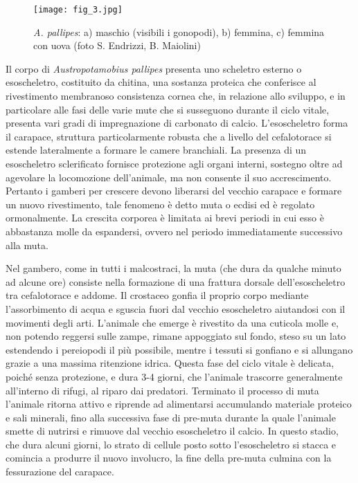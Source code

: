\documentclass[11pt,a4paper,italian,twoside,openany]{memoir}
\begin{document}
\begin{figure}[H]
  \centering
  \texttt{[image: fig\_3.jpg]}
  \caption{\emph{A. pallipes}: a) maschio (visibili i gonopodi), b) femmina, c) femmina con uova (foto S. Endrizzi, B. Maiolini)}
  \label{fig_3}
\end{figure}

Il corpo di \emph{Austropotamobius pallipes} presenta uno scheletro esterno o esoscheletro, costituito da chitina, una sostanza proteica che conferisce al rivestimento membranoso consistenza cornea che, in relazione allo sviluppo, e in particolare alle fasi delle varie mute che si susseguono durante il ciclo vitale, presenta vari gradi di impregnazione di carbonato di calcio. L'esoscheletro forma il carapace, struttura particolarmente robusta che a livello del cefalotorace si estende lateralmente a formare le camere branchiali. La presenza di un esoscheletro sclerificato fornisce protezione agli organi interni, sostegno oltre ad agevolare la locomozione dell'animale, ma non consente il suo accrescimento. Pertanto i gamberi per crescere devono liberarsi del vecchio carapace e formare un nuovo rivestimento, tale fenomeno è detto muta o ecdisi ed è regolato ormonalmente. La crescita corporea è limitata ai brevi periodi in cui esso è abbastanza molle da espandersi, ovvero nel periodo immediatamente successivo alla muta.

Nel gambero, come in tutti i malcostraci, la muta (che dura da qualche minuto ad alcune ore) consiste nella formazione di una frattura dorsale dell'esoscheletro tra cefalotorace e addome. Il crostaceo gonfia il proprio corpo mediante l'assorbimento di acqua e sguscia fuori dal vecchio esoscheletro aiutandosi con il movimenti degli arti. L'animale che emerge è rivestito da una cuticola molle e, non potendo reggersi sulle zampe, rimane appoggiato sul fondo, steso su un lato estendendo i pereiopodi il più possibile, mentre i tessuti si gonfiano e si allungano grazie a una massima ritenzione idrica. Questa fase del ciclo vitale è delicata, poiché senza protezione, e dura 3-4 giorni, che l'animale trascorre generalmente all'interno di rifugi, al riparo dai predatori. Terminato il processo di muta l'animale ritorna attivo e riprende ad alimentarsi accumulando materiale proteico e sali minerali, fino alla successiva fase di pre-muta durante la quale l'animale smette di nutrirsi e rimuove dal vecchio esoscheletro il calcio. In questo stadio, che dura alcuni giorni, lo strato di cellule posto sotto l'esoscheletro si stacca e comincia a produrre il nuovo involucro, la fine della pre-muta culmina con la fessurazione del carapace.
\end{document}
